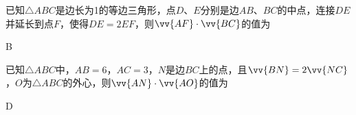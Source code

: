 \begin{exercise}
      已知$\triangle{ABC}$是边长为1的等边三角形，点$D$、$E$分别是边$AB$、$BC$的中点，连接$DE$并延长到点$F$，使得$DE=2EF$，则$\vv{AF}\cdot\vv{BC}$的值为\xz
      \begin{answer}
        B
      \end{answer}
    \item %
      已知$\triangle{ABC}$中，$AB=6$，$AC=3$，$N$是边$BC$上的点，且$\vv{BN}=2\vv{NC}$，$O$为$\triangle{ABC}$的外心，则$\vv{AN}\cdot\vv{AO}$的值为\xz
      \begin{answer}
        D
      \end{answer}



\end{exercise}
